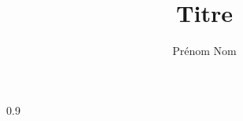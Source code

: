 \documentclass[11pt]{article}
\title{Titre}
\author{Prénom Nom}
\begin{document}

\tableofcontents
\newpage


\newpage


\newpage

\newpage

\newpage

\newpage

\newpage

\newpage


\newpage

\newpage

\newpage





{
\renewcommand{\bibname}{\LARGE\bfseries Bibliography}
\vspace{1em}
\begin{spacing}{0.9}
\footnotesize

\end{spacing}
\vspace{1em}
}

\newpage

\end{document}

